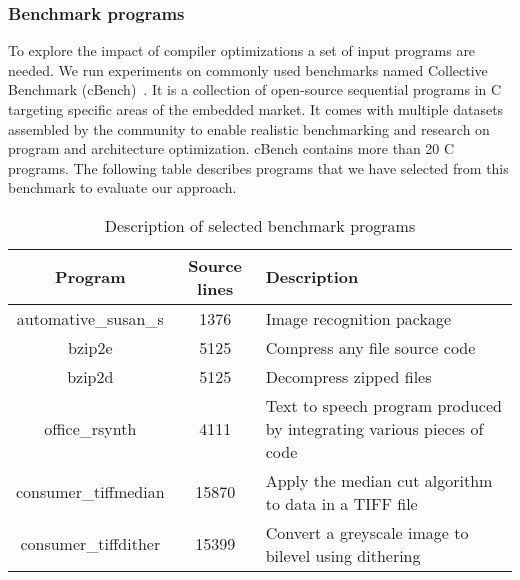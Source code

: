 \subsubsection{Benchmark programs}
To explore the impact of compiler optimizations a set of input programs are needed. We run experiments on commonly used benchmarks named Collective Benchmark (cBench)~\cite{fursin2009collective}. It is a collection of open-source sequential programs in C targeting specific areas of the embedded market. It comes with multiple datasets assembled by the community to enable realistic benchmarking and research on program and architecture optimization. cBench contains more than 20 C programs. The following table describes programs that we have selected from this benchmark to evaluate our approach.
\begin{table}[h]
	\begin{center}
		\begin{tabular}{|c|c|p{3.9cm}|}
			\hline
			\textbf{Program} & \textbf{Source lines} & \textbf{Description}\\
			\hline
			automative\_susan\_s & 1376 & Image recognition package\\
			\hline
			bzip2e & 5125 & Compress any file
			source code \\
			\hline
			bzip2d & 5125 & Decompress zipped files \\
			\hline
			office\_rsynth & 4111 & Text to speech program produced by integrating various pieces of code\\
			\hline
			consumer\_tiffmedian& 15870 & Apply the median cut algorithm to data in a TIFF file
			\\
			
			\hline
			 consumer\_tiffdither& 15399 & Convert a greyscale image to bilevel using dithering
			 \\
			\hline
			
		\end{tabular}
		
	\end{center}
	\caption {Description of selected benchmark programs}
\end{table}
